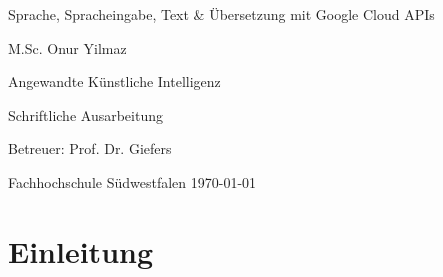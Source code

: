 \documentclass[12pt,a4paper]{article}
\begin{document}
	
		
		\begin{titlepage}
			\begin{center}
				\vspace*{1cm}
				\Huge
				Sprache, Spracheingabe, Text \& Übersetzung mit Google Cloud APIs
				
				
				\vspace{1.5cm}
				\LARGE
				M.Sc. Onur Yilmaz
				
				\vspace{1.5cm}
				\Large
				Angewandte Künstliche Intelligenz
				
				\vfill
				
				Schriftliche Ausarbeitung
				
				\vspace{0.8cm}
				\Large
				Betreuer: Prof. Dr. Giefers
				
				\vspace{0.5cm}
				\large
				Fachhochschule Südwestfalen
				\today
			\end{center}
		\end{titlepage}

\thispagestyle{empty}
\tableofcontents

\newpage
	\section{Einleitung} \cite{google}
	

\newpage
	
\end{document}
